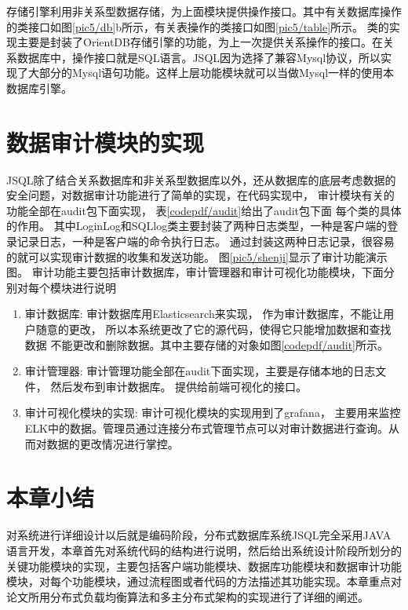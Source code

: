 存储引擎利用非关系型数据存储，为上面模块提供操作接口。其中有关数据库操作的类接口如图\ref{pic5/db}b所示，有关表操作的类接口如图\ref{pic5/table}所示。
类的实现主要是封装了OrientDB存储引擎的功能，为上一次提供关系操作的接口。在关系数据库中，操作接口就是SQL语言。JSQL因为选择了兼容Mysql协议，所以实现了大部分的Mysql语句功能。这样上层功能模块就可以当做Mysql一样的使用本数据库引擎。
\section{数据审计模块的实现}
JSQL除了结合关系数据库和非关系型数据库以外，还从数据库的底层考虑数据的安全问题，对数据审计功能进行了简单的实现，在代码实现中，
审计模块有关的功能全部在audit包下面实现，
表\ref{codepdf/audit}给出了audit包下面
每个类的具体的作用。
其中LoginLog和SQLlog类主要封装了两种日志类型，一种是客户端的登录记录日志，一种是客户端的命令执行日志。
通过封装这两种日志记录，很容易的就可以实现审计数据的收集和发送功能。
图\ref{pic5/shenji}显示了审计功能演示图。
审计功能主要包括审计数据库，审计管理器和审计可视化功能模块，下面分别对每个模块进行说明
\begin{enumerate}[fullwidth,itemindent=2em,listparindent=2em]
	\item 审计数据库:
	审计数据库用Elasticsearch来实现，
	作为审计数据库，不能让用户随意的更改，
	所以本系统更改了它的源代码，使得它只能增加数据和查找数据
	不能更改和删除数据。其中主要存储的对象如图\ref{codepdf/audit}所示。
	\item 审计管理器:
	审计管理功能全部在audit下面实现，主要是存储本地的日志文件，
	然后发布到审计数据库。
	提供给前端可视化的接口。
	\item 审计可视化模块的实现:
	审计可视化模块的实现用到了grafana，
	主要用来监控ELK中的数据。管理员通过连接分布式管理节点可以对审计数据进行查询。从而对数据的更改情况进行掌控。
\end{enumerate}
\section{本章小结}
对系统进行详细设计以后就是编码阶段，分布式数据库系统JSQL完全采用JAVA语言开发，本章首先对系统代码的结构进行说明，然后给出系统设计阶段所划分的关键功能模块的实现，主要包括客户端功能模块、数据库功能模块和数据审计功能模块，对每个功能模块，通过流程图或者代码的方法描述其功能实现。本章重点对论文所用分布式负载均衡算法和多主分布式架构的实现进行了详细的阐述。
